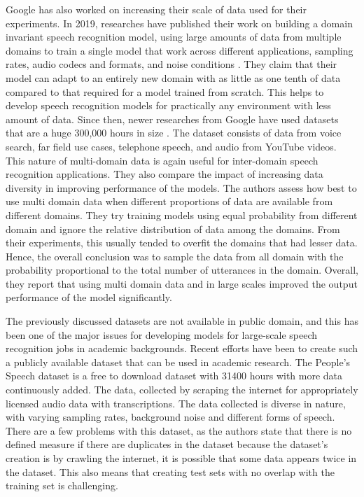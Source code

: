 Google has also worked on increasing their scale of data used for their experiments. In 2019, researches have published their work on building a domain invariant speech recognition model, using large amounts of data from multiple domains to train a single model that work across different applications, sampling rates, audio codecs and formats, and  noise conditions \cite{Narayanan2019TowardTraining}. They claim that their model can adapt to an entirely new domain with as little as one tenth of data compared to that required for a model trained from scratch. This helps to develop speech recognition models for practically any environment with less amount of data. Since then, newer researches from Google have used datasets that are a huge 300,000 hours in size \cite{NarayananRECOGNIZINGMODELS}. The dataset consists of data from voice search, far field use cases, telephone speech, and audio from YouTube videos. This nature of multi-domain data is again useful for inter-domain speech recognition applications. They also compare the impact of increasing data diversity in improving performance of the models. The authors assess how best to use multi domain data when different proportions of data are available from different domains. They try training models using equal probability from different domain and ignore the relative distribution of data among the domains. From their experiments, this usually tended to overfit the domains that had lesser data. Hence, the overall conclusion was to sample the data from all domain with the probability proportional to the total number of utterances in the domain. Overall, they report that using multi domain data and in large scales improved the output performance of the model significantly.

The previously discussed datasets are not available in public domain, and this has been one of the major issues for developing models for large-scale speech recognition jobs in academic backgrounds. Recent efforts \cite{GalvezTheUsage, Pratap2020MLS:Research} have been to create such a publicly available dataset that can be used in academic research. The People's Speech dataset \cite{GalvezTheUsage} is a free to download dataset with 31400 hours with more data continuously added. The data, collected by scraping the internet for appropriately licensed audio data with transcriptions. The data collected is diverse in nature, with varying sampling rates, background noise and different forms of speech. There are a few problems with this dataset, as the authors state that there is no defined measure if there are duplicates in the dataset because the dataset's creation is by crawling the internet, it is possible that some data appears twice in the dataset. This also means that creating test sets with no overlap with the training set is challenging. 

